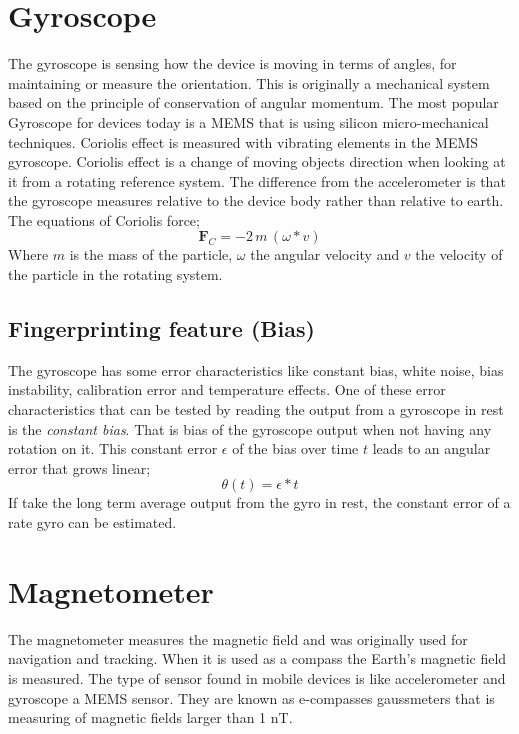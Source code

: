 \section{Gyroscope}\label{sec:gyroscope}
The gyroscope is sensing how the device is moving in terms of angles, for maintaining or measure the orientation. This is originally  a mechanical system based on the principle of conservation of angular momentum. The most popular Gyroscope for devices today is a MEMS that is using silicon micro-mechanical techniques. Coriolis effect is measured with vibrating elements in the MEMS gyroscope. Coriolis effect is a change of moving objects direction when looking at it from a rotating reference system. The difference from the accelerometer is that the gyroscope measures relative to the device body rather than relative to earth. The equations of Coriolis force;  
$$\boldsymbol{ F}_C = -2 \, m \, (\omega *  v)$$
Where $m$ is the mass of the particle, $\omega$ the angular velocity and $v$ the velocity of the particle in the rotating system. 
\cite[]{sensor:inertialNav}
\subsection{Fingerprinting feature (Bias)}
The gyroscope has some error characteristics like constant bias, white noise, bias instability, calibration error and temperature effects. One of these error characteristics that can be tested by reading the output from a gyroscope in rest is the \textit{constant bias}. That is bias of the gyroscope output when not having any rotation on it. This constant error $\epsilon$ of the bias over time $t$ leads to an angular error that grows linear; 
\begin{equation} \label{eq:gyroBias}
\theta (t)= \epsilon * t
\end{equation}
If take the long term average output from the gyro in rest, the constant error of a rate gyro can be estimated.\cite[]{sensors:fusion}


\section{Magnetometer}
The magnetometer measures the magnetic field and was originally used for navigation and tracking. When it is used as a compass the Earth's magnetic field is measured. The type of sensor found in mobile devices is like accelerometer and gyroscope a MEMS sensor. They are known as e-compasses gaussmeters that is measuring of magnetic fields larger than 1 nT.
~\cite[]{sensor:magn}

